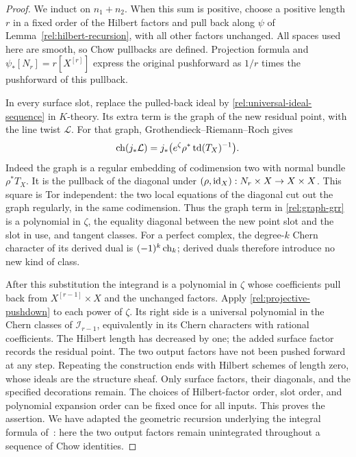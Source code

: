 \begin{proof}
We induct on $n_1+n_2$.  When this sum is positive, choose a positive
length $r$ in a fixed order of the Hilbert factors and pull back along
$\psi$ of Lemma~\ref{rel:hilbert-recursion}, with all other factors
unchanged.  All spaces used here are smooth, so Chow pullbacks are
defined.  Projection formula and $\psi_*[N_r]=r[X^{[r]}]$ express the
original pushforward as $1/r$ times the pushforward of this pullback.

In every surface slot, replace the pulled-back ideal by
\eqref{rel:universal-ideal-sequence} in $K$-theory.  Its extra term is
the graph of the new residual point, with the line twist $\mathcal L$.
For that graph, Grothendieck--Riemann--Roch gives
\begin{equation}
 \operatorname{ch}(j_*\mathcal L)
 =j_*\bigl(e^{\zeta}\rho^*\operatorname{td}(T_X)^{-1}\bigr).
 \label{rel:graph-grr}
\end{equation}
Indeed the graph is a regular embedding of codimension two with
normal bundle $\rho^*T_X$.  It is the pullback of the diagonal under
$(\rho,\operatorname{id}_X):N_r\times X\to X\times X$.  This square is Tor
independent: the two local equations of the diagonal cut out the graph
regularly, in the same codimension.  Thus the graph term in
\eqref{rel:graph-grr} is a polynomial in $\zeta$, the equality diagonal
between the new point slot and the slot in use, and tangent classes.
For a perfect complex, the degree-$k$ Chern character of its derived
dual is $(-1)^k\operatorname{ch}_k$; derived duals therefore introduce no new kind
of class.

After this substitution the integrand is a polynomial in $\zeta$
whose coefficients pull back from
$X^{[r-1]}\times X$ and the unchanged factors.  Apply
\eqref{rel:projective-pushdown} to each power of $\zeta$.
Its right side is a universal polynomial in the Chern classes of
$\mathcal I_{r-1}$, equivalently in its Chern characters with rational
coefficients.  The Hilbert length has decreased by one; the added
surface factor records the residual point.  The two output factors
have not been pushed forward at any step.  Repeating the construction
ends with Hilbert schemes of length zero, whose ideals are the
structure sheaf.  Only surface factors, their diagonals, and the
specified decorations remain.  The choices of Hilbert-factor order,
slot order, and polynomial expansion order can be fixed once for all
inputs.  This proves the assertion.  We have adapted the geometric
recursion underlying the integral formula of~\cite[Section~3,
Proposition~3.1]{EGL}: here the two output factors remain unintegrated
throughout a sequence of Chow identities.
\end{proof}


